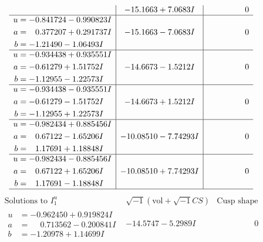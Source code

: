 \documentclass[1p]{elsarticle_modified}
\theoremstyle{definition}
\newcommand{\I}{\sqrt{-1}}
\begin{document}
$$\begin{array}{c|c|c}
 & -15.1663 + 7.0683 I & \phantom{-0.000000 } 0 \\ \hline\begin{aligned}
u &= -0.841724 - 0.990823 I \\
a &= \phantom{-}0.377207 + 0.291737 I \\
b &= -1.21490 - 1.06493 I\end{aligned}
 & -15.1663 - 7.0683 I & \phantom{-0.000000 } 0 \\ \hline\begin{aligned}
u &= -0.934438 + 0.935551 I \\
a &= -0.61279 + 1.51752 I \\
b &= -1.12955 - 1.22573 I\end{aligned}
 & -14.6673 - 1.5212 I & \phantom{-0.000000 } 0 \\ \hline\begin{aligned}
u &= -0.934438 - 0.935551 I \\
a &= -0.61279 - 1.51752 I \\
b &= -1.12955 + 1.22573 I\end{aligned}
 & -14.6673 + 1.5212 I & \phantom{-0.000000 } 0 \\ \hline\begin{aligned}
u &= -0.982434 + 0.885456 I \\
a &= \phantom{-}0.67122 - 1.65206 I \\
b &= \phantom{-}1.17691 + 1.18848 I\end{aligned}
 & -10.08510 - 7.74293 I & \phantom{-0.000000 } 0 \\ \hline\begin{aligned}
u &= -0.982434 - 0.885456 I \\
a &= \phantom{-}0.67122 + 1.65206 I \\
b &= \phantom{-}1.17691 - 1.18848 I\end{aligned}
 & -10.08510 + 7.74293 I & \phantom{-0.000000 } 0\\
 \hline 
 \end{array}$$\newpage$$\begin{array}{c|c|c}  
\text{Solutions to }I^u_{1}& \I (\text{vol} + \sqrt{-1}CS) & \text{Cusp shape}\\
 \hline 
\begin{aligned}
u &= -0.962450 + 0.919824 I \\
a &= \phantom{-}0.713562 - 0.200841 I \\
b &= -1.20978 + 1.14699 I\end{aligned}
 & -14.5747 - 5.2989 I & \phantom{-0.000000 } 0 \\ \hline\begin{aligned}

\end{aligned}
\end{array}$$
\end{document}
